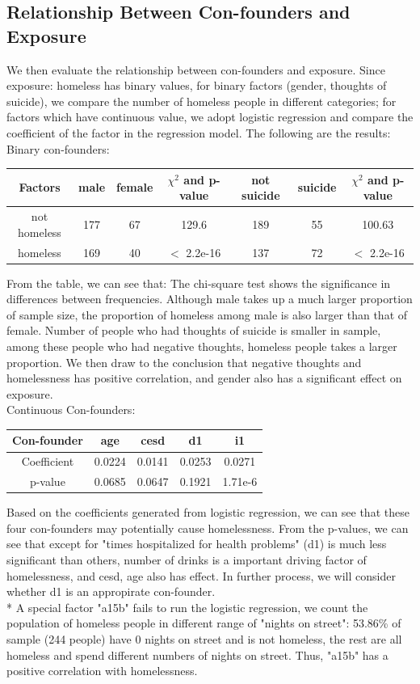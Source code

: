 \documentclass{report}
\begin{document}
\subsection{Relationship Between Con-founders and Exposure}
We then evaluate the relationship between con-founders and exposure. Since exposure: homeless has binary values, for binary factors (gender, thoughts of suicide), we compare the number of homeless people in different categories; for factors which have continuous value, we adopt logistic regression and compare the coefficient of the factor in the regression model. The following are the results:\\[0.1in]
Binary con-founders:
\begin{center}
 \begin{tabular}{||c | c c | c || c c | c ||} 
 \hline
 Factors & male & female & $\chi^2$ and p-value & not suicide & suicide & $\chi^2$ and p-value\\ 
 \hline
 not homeless & 177 & 67 & 129.6 & 189 & 55 & 100.63 \\
 
 homeless & 169 & 40 & $<$ 2.2e-16 & 137 & 72 & $<$ 2.2e-16 \\
 \hline
\end{tabular}
\end{center}
From the table, we can see that: The chi-square test shows the significance in differences between frequencies. Although male takes up a much larger proportion of sample size, the proportion of homeless among male is also larger than that of female. Number of people who had thoughts of suicide is smaller in sample, among these people who had negative thoughts, homeless people takes a larger proportion. We then draw to the conclusion that negative thoughts and homelessness has positive correlation, and gender also has a significant effect on exposure. \\[0.1in]
Continuous Con-founders:
\begin{center}
 \begin{tabular}{|| c | c | c | c | c ||} 
 \hline
 Con-founder & age & cesd & d1 & i1 \\ 
 \hline
 Coefficient & 0.0224 & 0.0141 & 0.0253 & 0.0271 \\
 \hline
 p-value & 0.0685 & 0.0647 & 0.1921 & 1.71e-6 \\
 \hline
\end{tabular}
\end{center}
Based on the coefficients generated from logistic regression, we can see that these four con-founders may potentially cause homelessness. From the p-values, we can see that except for "times hospitalized for health problems" (d1) is much less significant than others, number of drinks is a important driving factor of homelessness, and cesd, age also has effect. In further process, we will consider whether d1 is an appropirate con-founder.\\
* A special factor "a15b" fails to run the logistic regression, we count the population of homeless people in different range of "nights on street": 53.86\% of sample (244 people) have 0 nights on street and is not homeless, the rest are all homeless and spend different numbers of nights on street. Thus, "a15b" has a positive correlation with homelessness.
\end{document}
